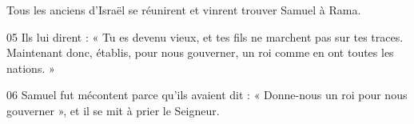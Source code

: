 Tous les anciens d’Israël se réunirent et vinrent trouver Samuel à Rama.

05 Ils lui dirent : « Tu es devenu vieux, et tes fils ne marchent pas sur tes traces. Maintenant donc, établis, pour nous gouverner, un roi comme en ont toutes les nations. »

06 Samuel fut mécontent parce qu’ils avaient dit : « Donne-nous un roi pour nous gouverner », et il se mit à prier le Seigneur.
